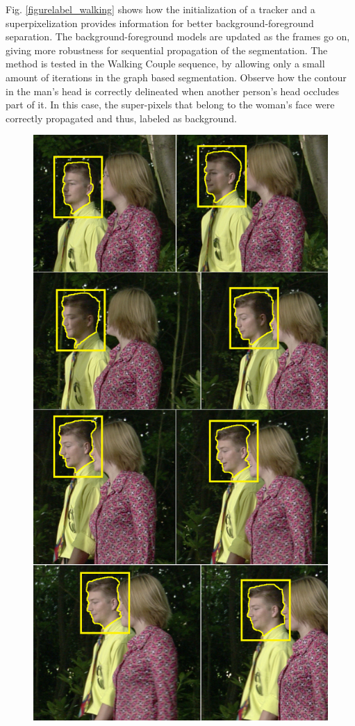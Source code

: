 Fig. \ref{figurelabel_walking} shows how the initialization of a
tracker and a superpixelization provides information
for better background-foreground separation. The
background-foreground models are updated as the
frames go on, giving more robustness for sequential
propagation of the segmentation. The method is tested in the 
Walking Couple sequence,
by allowing only a small amount of iterations in the
graph based segmentation. Observe how the contour
in the man’s head is correctly delineated when
another person’s head occludes part of it. In this case,
the super-pixels that belong to the woman’s face
were correctly propagated and thus, labeled as
background. \\
   \begin{figure}[thpb]
      \centering
      \includegraphics[height=0.66\textheight]{images/Sequence2.png}

\end{figure}

